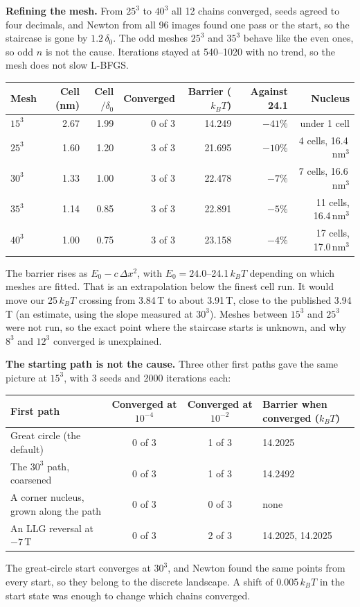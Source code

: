 \documentclass[10pt,a4paper]{article}
\begin{document}
\textbf{Refining the mesh.} From $25^3$ to $40^3$ all 12 chains converged, seeds agreed to four decimals, and Newton from all 96 images
found one pass or the start, so the staircase is gone by $1.2\,\delta_0$. The odd meshes $25^3$ and $35^3$ behave like the even ones, so
odd $n$ is not the cause. Iterations stayed at 540--1020 with no trend, so the mesh does not slow L-BFGS.
\begin{center}\small
\begin{tabular}{@{}l r r r r r r@{}}
\toprule
Mesh & Cell (nm) & Cell$/\delta_0$ & Converged & Barrier ($k_BT$) & Against 24.1 & Nucleus \\
\midrule
$15^3$ & 2.67 & 1.99 & 0 of 3 & 14.249 & $-41\%$ & under 1 cell \\
$25^3$ & 1.60 & 1.20 & 3 of 3 & 21.695 & $-10\%$ & 4 cells, 16.4\,nm$^3$ \\
$30^3$ & 1.33 & 1.00 & 3 of 3 & 22.478 & $-7\%$ & 7 cells, 16.6\,nm$^3$ \\
$35^3$ & 1.14 & 0.85 & 3 of 3 & 22.891 & $-5\%$ & 11 cells, 16.4\,nm$^3$ \\
$40^3$ & 1.00 & 0.75 & 3 of 3 & 23.158 & $-4\%$ & 17 cells, 17.0\,nm$^3$ \\
\bottomrule
\end{tabular}
\end{center}
The barrier rises as $E_0 - c\,\Delta x^2$, with $E_0 = 24.0$--24.1\,$k_BT$ depending on which meshes are fitted. That is an
extrapolation below the finest cell run. It would move our 25\,$k_BT$ crossing from 3.84\,T to about 3.91\,T, close to the published
3.94\,T (an estimate, using the slope measured at $30^3$). Meshes between $15^3$ and $25^3$ were not run, so the exact point where the
staircase starts is unknown, and why $8^3$ and $12^3$ converged is unexplained.

\textbf{The starting path is not the cause.} Three other first paths gave the same picture at $15^3$, with 3 seeds and 2000 iterations
each:
\begin{center}\small
\begin{tabular}{@{}l c c l@{}}
\toprule
First path & Converged at $10^{-4}$ & Converged at $10^{-2}$ & Barrier when converged ($k_BT$) \\
\midrule
Great circle (the default) & 0 of 3 & 1 of 3 & 14.2025 \\
The $30^3$ path, coarsened & 0 of 3 & 1 of 3 & 14.2492 \\
A corner nucleus, grown along the path & 0 of 3 & 0 of 3 & none \\
An LLG reversal at $-7$\,T & 0 of 3 & 2 of 3 & 14.2025, 14.2025 \\
\bottomrule
\end{tabular}
\end{center}
The great-circle start converges at $30^3$, and Newton found the same points from every start, so they belong to the discrete
landscape. A shift of 0.005\,$k_BT$ in the start state was enough to change which chains converged.
\end{document}
